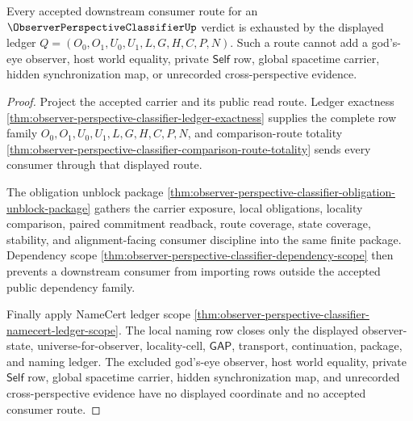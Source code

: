 \begin{theorem}
\label{thm:observerperspectiveclassifier-ledger-exhaustion}
Every accepted downstream consumer route for an $\ObserverPerspectiveClassifierUp$ verdict is exhausted by the displayed ledger $Q=(O_0,O_1,U_0,U_1,L,G,H,C,P,N)$. Such a route cannot add a god's-eye observer, host world equality, private $\mathsf{Self}$ row, global spacetime carrier, hidden synchronization map, or unrecorded cross-perspective evidence.
\end{theorem}
\begin{proof}
Project the accepted carrier and its public read route. Ledger exactness \autoref{thm:observer-perspective-classifier-ledger-exactness} supplies the complete row family $O_0,O_1,U_0,U_1,L,G,H,C,P,N$, and comparison-route totality \autoref{thm:observer-perspective-classifier-comparison-route-totality} sends every consumer through that displayed route.

The obligation unblock package \autoref{thm:observer-perspective-classifier-obligation-unblock-package} gathers the carrier exposure, local obligations, locality comparison, paired commitment readback, route coverage, state coverage, stability, and alignment-facing consumer discipline into the same finite package. Dependency scope \autoref{thm:observer-perspective-classifier-dependency-scope} then prevents a downstream consumer from importing rows outside the accepted public dependency family.

Finally apply NameCert ledger scope \autoref{thm:observer-perspective-classifier-namecert-ledger-scope}. The local naming row closes only the displayed observer-state, universe-for-observer, locality-cell, $\mathsf{GAP}$, transport, continuation, package, and naming ledger. The excluded god's-eye observer, host world equality, private $\mathsf{Self}$ row, global spacetime carrier, hidden synchronization map, and unrecorded cross-perspective evidence have no displayed coordinate and no accepted consumer route.
\end{proof}

